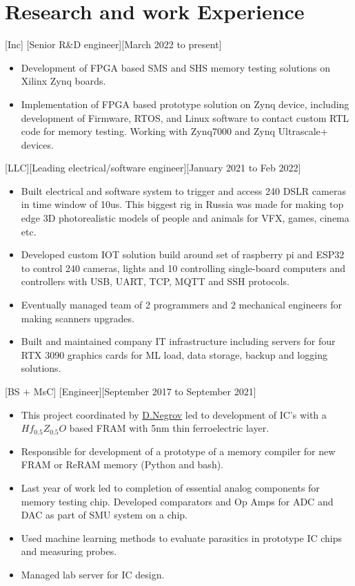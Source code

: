 \documentclass{article}
\begin{document}
\section{Research and work Experience}
[Inc]
[Senior R\&D engineer][March 2022 to present]
   \begin{itemize}
      \item Development of FPGA based SMS and SHS memory testing solutions on Xilinx Zynq boards.
      \item Implementation of FPGA based prototype solution on Zynq device, including development of Firmware, RTOS, and Linux software to contact custom RTL code for memory testing. Working with Zynq7000 and Zynq Ultrascale+ devices.
   \end{itemize}  

[LLC][Leading electrical/software engineer][January 2021 to Feb 2022]
\begin{itemize}
   \item Built electrical and software system to trigger and access 240 DSLR cameras in time window of 10us. This biggest rig in Russia was made for making top edge 3D photorealistic models of people and animals for VFX, games, cinema etc.
   \item Developed custom IOT solution build around set of raspberry pi and ESP32 to control 240 cameras, lights and 10 controlling single-board computers and controllers with USB, UART, TCP, MQTT and SSH protocols.
   \item Eventually managed team of 2 programmers and 2 mechanical engineers for making scanners upgrades.
   \item Built and maintained company IT infrastructure including servers for four RTX 3090 graphics cards for ML load, data storage, backup and logging solutions.
\end{itemize}

[BS + MsC]
[Engineer][September 2017 to September 2021]
\begin{itemize}
\item This project coordinated by  \href{https://www.scopus.com/authid/detail.uri?authorId=56272708000}{D.Negrov}   led to development of IC's with a $Hf_{0.5} Z_{0.5} O $ based  FRAM with 5nm thin ferroelectric layer.
\item Responsible for development of a prototype of a memory  compiler for new FRAM or ReRAM memory (Python and bash).
\item Last year of work led to completion of essential analog components for memory testing chip. Developed comparators and Op Amps for ADC and DAC as part of SMU system on a chip.
\item Used machine learning methods to evaluate parasitics in prototype IC chips and measuring probes.
\item Managed lab server for IC design.
\end{itemize}
\end{document}

